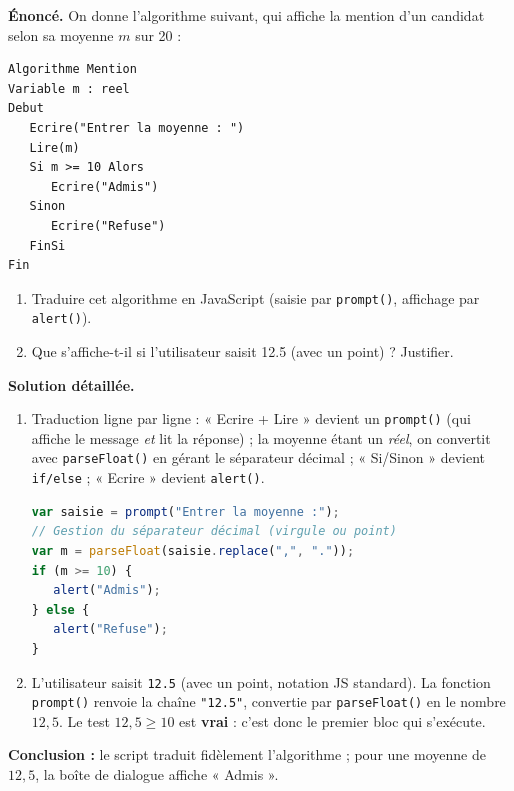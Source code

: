 \documentclass[11pt]{article}
\begin{document}
\begin{exoresolu}
\textbf{Énoncé.} On donne l'algorithme suivant, qui affiche la mention d'un candidat selon sa moyenne $m$ sur 20 :
\begin{lstlisting}
Algorithme Mention
Variable m : reel
Debut
   Ecrire("Entrer la moyenne : ")
   Lire(m)
   Si m >= 10 Alors
      Ecrire("Admis")
   Sinon
      Ecrire("Refuse")
   FinSi
Fin
\end{lstlisting}
\begin{enumerate}
  \item Traduire cet algorithme en JavaScript (saisie par \texttt{prompt()}, affichage par \texttt{alert()}).
  \item Que s'affiche-t-il si l'utilisateur saisit 12.5 (avec un point) ? Justifier.
\end{enumerate}
\tcblower
\textbf{Solution détaillée.}
\begin{enumerate}
  \item Traduction ligne par ligne : « Ecrire + Lire » devient un \texttt{prompt()} (qui affiche le message \emph{et} lit la réponse) ; la moyenne étant un \emph{réel}, on convertit avec \texttt{parseFloat()} en gérant le séparateur décimal ; « Si/Sinon » devient \texttt{if/else} ; « Ecrire » devient \texttt{alert()}.
\begin{lstlisting}[language=JavaScript]
var saisie = prompt("Entrer la moyenne :");
// Gestion du séparateur décimal (virgule ou point)
var m = parseFloat(saisie.replace(",", "."));
if (m >= 10) {
   alert("Admis");
} else {
   alert("Refuse");
}
\end{lstlisting}
  \item L'utilisateur saisit \texttt{12.5} (avec un point, notation JS standard). La fonction \texttt{prompt()} renvoie la chaîne \texttt{"12.5"}, convertie par \texttt{parseFloat()} en le nombre $12,5$. Le test $12,5 \geq 10$ est \textbf{vrai} : c'est donc le premier bloc qui s'exécute.
\end{enumerate}
\textbf{Conclusion :} le script traduit fidèlement l'algorithme ; pour une moyenne de $12,5$, la boîte de dialogue affiche « Admis ».
\end{exoresolu}
\end{document}
